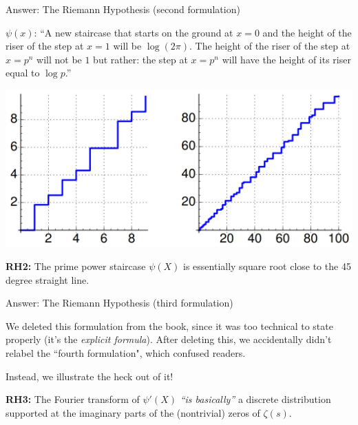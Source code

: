 \documentclass{beamer}
\begin{document}
\begin{frame}{Answer: The Riemann Hypothesis  (second formulation)}

  $\psi(x)$: ``A new staircase that starts on the ground at $x=0$ and the height of the
  riser of the step at $x=1$ will be $\log(2\pi)$. The height of the
  riser of the step at $x=p^n$ will not be $1$
  but rather: the step at $x=p^n$ will have the height of its riser
  equal to $\log p$.''

  \begin{center}
    \includegraphics[height=.4\textheight]{pics/psi}
  \end{center}

  \begin{block}{}
    \textbf{RH2:} The prime power staircase $\psi(X)$ is essentially square root close
    to the 45 degree straight line.
  \end{block}

\end{frame}

\begin{frame}{Answer: The Riemann Hypothesis (third formulation)}

  We deleted this formulation from the book, since it was too technical to state properly (it's the {\em explicit formula}). After deleting this, we accidentally didn't relabel the ``fourth formulation", which confused readers.

  \vfill

  Instead, we illustrate the heck out of it!

  \vfill

    \begin{block}{}
    \textbf{RH3:} The Fourier transform
    of $\psi'(X)$ \emph{``is basically''}
    a discrete distribution supported at the imaginary parts of the
    (nontrivial) zeros of $\zeta(s)$.

  \end{block}

\end{frame}
\end{document}
